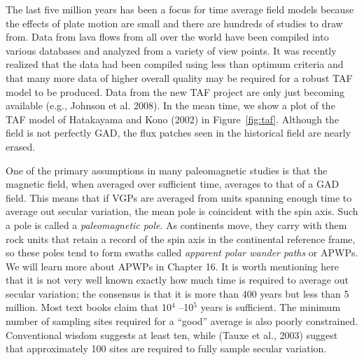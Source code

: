 The last five million years has been a focus  for time average field models because the effects of plate motion are small  and there are hundreds of studies to draw from. Data from lava flows from all over the world have been compiled into various databases and analyzed from a variety of view points.  It was recently realized that the data had been compiled using less than optimum criteria and that many more data of higher overall quality may be required for  a robust TAF model to be produced.  Data from the new TAF project are only just becoming available  (e.g., Johnson et al. 2008).  In the mean time, we show a plot of the  TAF model of Hatakayama and Kono (2002) in Figure~\ref{fig:taf}.  Although the field is not perfectly GAD, the flux patches seen in the historical field are nearly erased.  

One of the primary assumptions in many paleomagnetic studies is that the magnetic field, when averaged over sufficient time, averages to that of a GAD field.    This means that if VGPs are averaged from units spanning enough time to average out secular variation, the mean pole is coincident with the spin axis.     Such a pole is called a 
{\it paleomagnetic pole}.  As continents move, they carry with them rock units that retain a record of the spin axis in the continental reference frame, so these poles tend to form swaths called {\it apparent polar wander paths} or APWPs.  We will learn more about APWPs in Chapter 16.  It is worth mentioning here that it is not very well known exactly how much time is required to average out secular variation;  the consensus is that it is more than 400 years but less than 5 million.    Most text books claim that 10$^4$ --10$^5$ years is sufficient.  The minimum number of sampling sites required for a ``good'' average is also poorly constrained.  Conventional wisdom suggests at least ten,   while  (Tauxe et al., 2003) suggest that approximately 100 sites are required to fully sample secular variation.    


